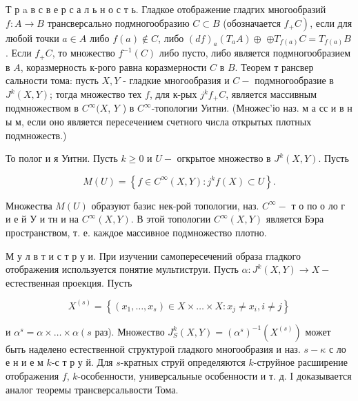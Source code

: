 \documentclass[10pt]{article}
\begin{document}
Т р a в с в е р с а л ь н о с т ь. Гладкое отображение гладгих многообразий $f: A \rightarrow B$ трансверсально подмногообразию $C \subset B$ (обозначается $\left.f_{+} C\right)$, если для любой точки $a \in A$ либо $f(a) \notin C$, либо $(d f)_{a}\left(T_{a} A\right) \oplus$ $\oplus T_{f(a)} C=T_{f(a)} B$. Если $f_{+} C$, то множество $f^{-1}(C)$ либо пусто, либо является подмногообразием в $A$, коразмерность к-рого равна коразмерности $C$ в $B$. Теорем т рансвер сальности тома: пусть $X, Y$ - гладкие многообразия и $C-$ подмногообразие в $J^{k}(X, Y)$; тогда множество тех $f$, для к-рых $j^{k} f_{+} C$, является массивным подмножеством в $C^{\infty}(X$, $Y$ ) в $C^{\infty}$-топологии Уитни. (Множес'іо наз. м а сс и в н ы м, если оно является пересечением счетного числа открытых плотных подмножеств.)



То полог и я Уитни. Пусть $k \geqslant 0$ и $U-$ огкрытое множество в $J^{k}(X, Y)$. Пусть



\[

M(U)=\left\{f \in C^{\infty}(X, Y): j^{k} f(X) \subset U\right\} .

\]



Множества $M(U)$ образуют базис нек-рой топологии, наз. $C^{\infty}-$ т о по о ло г и е й У и тн и на $C^{\infty}(X, Y)$. В этой топологии $C^{\infty}(X, Y)$ является Бэра пространством, т. е. каждое массивное подмножество плотно.



М у л в т и с т р у и. При изучении самопересечений образа гладкого отображения используется понятие мультиструи. Пусть $\alpha: J^{k}(X, Y) \rightarrow X-$ естественная проекция. Пусть



\[

X^{(s)}=\left\{\left(x_{1}, \ldots, x_{s}\right) \in X \times \ldots \times X: x_{j} \neq x_{i}, i \neq j\right\}

\]



и $\alpha^{s}=\alpha \times \ldots \times \alpha\left(s\right.$ раз). Множество $J_{S}^{k}(X, Y)=\left(\alpha^{s}\right)^{-1}\left(X^{(s)}\right)$ может быть наделено естественной структурой гладкого многообразия и наз. $s-\kappa$ с ло е н и е м $k$-с т р у й. Для $s$-кратных струй определяются $k$-струйное расширение отображения $f$, $k$-особенности, универсальные особенности и т. д. I доказывается аналог теоремы трансверсальвости Тома.
\end{document}
